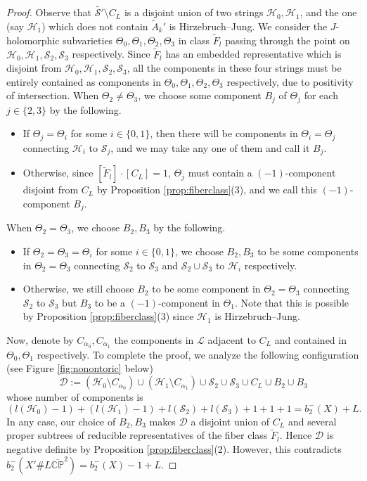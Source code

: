 \documentclass[11pt]{article}
\theoremstyle{definition}
\theoremstyle{remark}
\newcommand{\CP}{\mathbb{CP}}
\newcommand{\st}{\mathcal{S}}
\begin{document}
\begin{proof}
Observe that $\tilde{\st'}\setminus C_L$ is a disjoint union of two strings $\mathcal{H}_0,\mathcal{H}_1$, and the one (say $\mathcal{H}_1$) which does not contain $\tilde{A}_k'$ is Hirzebruch--Jung. We consider the $J$-holomorphic subvarieties $\Theta_0,\Theta_1,\Theta_2,\Theta_3$ in class $\tilde{F}_l$ passing through the point on $\mathcal{H}_0,\mathcal{H}_1,\st_2,\st_3$ respectively. Since $\tilde{F}_l$ has an embedded representative which is disjoint from $\mathcal{H}_0,\mathcal{H}_1,\st_2,\st_3$, all the components in these four strings must be entirely contained as components in $\Theta_0,\Theta_1,\Theta_2,\Theta_3$ respectively, due to positivity of intersection. When $\Theta_2\neq \Theta_3$, we choose some component $B_j$ of $\Theta_j$ for each $j\in\{2,3\}$ by the following.
\begin{itemize}
  \item If $\Theta_j=\Theta_i$ for some $i\in\{0,1\}$, then there will be components in $\Theta_i=\Theta_j$ connecting $\mathcal{H}_i$ to $\st_j$, and we may take any one of them and call it $B_j$.
  \item Otherwise, since $[\tilde{F}_l]\cdot [C_L]=1$, $\Theta_j$ must contain a $(-1)$-component disjoint from $C_L$ by Proposition \ref{prop:fiberclass}(3), and we call this $(-1)$-component $B_j$. 
\end{itemize}
When $\Theta_2=\Theta_3$, we choose $B_2,B_3$ by the following.
\begin{itemize}
  \item If $\Theta_2=\Theta_3=\Theta_i$ for some $i\in\{0,1\}$, we choose $B_2,B_3$ to be some components in $\Theta_2=\Theta_3$ connecting $\st_2$ to $\st_3$ and  $\st_2\cup \st_3$ to $\mathcal{H}_i$ respectively.
  \item Otherwise, we still choose $B_2$ to be some component in $\Theta_2=\Theta_3$ connecting $\st_2$ to $\st_3$ but $B_3$ to be a $(-1)$-component in $\Theta_1$. Note that this is possible by Proposition \ref{prop:fiberclass}(3) since $\mathcal{H}_1$ is Hirzebruch--Jung.
\end{itemize}

  Now, denote by $C_{\alpha_0},C_{\alpha_1}$ the components in $\mathcal{L}$ adjacent to $C_L$ and contained in $\Theta_0,\Theta_1$ respectively. To complete the proof, we analyze the following configuration (see Figure \ref{fig:nonontoric} below) 
  \[\mathcal{D}:=(\mathcal{H}_0\setminus C_{\alpha_0})\cup(\mathcal{H}_1\setminus C_{\alpha_1})\cup \st_2\cup \st_3\cup C_L\cup B_2\cup B_3\]whose number of components is
  \[(l(\mathcal{H}_0)-1)+(l(\mathcal{H}_1)-1)+l(\st_2)+l(\st_3)+1+1+1=b_2^-(X)+L.\] In any case, our choice of $B_2,B_3$ makes $\mathcal{D}$ a disjoint union of $C_L$ and several proper subtrees of reducible representatives of the fiber class $\tilde{F}_l$. Hence $\mathcal{D}$ is negative definite by Proposition \ref{prop:fiberclass}(2). However, this contradicts $b_2^-(X'\# L\overline{\CP}^2)=b_2^-(X)-1+L$.
\end{proof}
\end{document}
